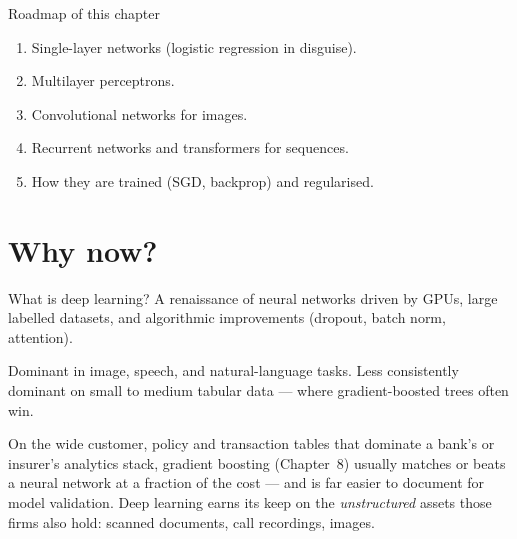 \documentclass[aspectratio=169,11pt]{beamer}
\begin{document}
\begin{frame}{Roadmap of this chapter}
  \begin{takeaway}
    \begin{enumerate}
      \item Single-layer networks (logistic regression in disguise).
      \item Multilayer perceptrons.
      \item Convolutional networks for images.
      \item Recurrent networks and transformers for sequences.
      \item How they are trained (SGD, backprop) and regularised.
    \end{enumerate}
  \end{takeaway}
\end{frame}

\section{Why now?}

\begin{frame}{What is deep learning?}
  A renaissance of neural networks driven by GPUs, large labelled
  datasets, and algorithmic improvements (dropout, batch norm,
  attention).
  \begin{takeaway}
    Dominant in image, speech, and natural-language tasks. Less
    consistently dominant on small to medium tabular data --- where
    gradient-boosted trees often win.
  \end{takeaway}
  \begin{industry}
    On the wide customer, policy and transaction tables that dominate a bank's or
    insurer's analytics stack, gradient boosting (Chapter~8) usually matches or beats a
    neural network at a fraction of the cost --- and is far easier to document for model
    validation. Deep learning earns its keep on the \emph{unstructured} assets those firms
    also hold: scanned documents, call recordings, images.
  \end{industry}
\end{frame}
\end{document}
